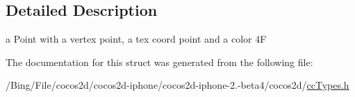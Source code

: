\subsection{Detailed Description}
a Point with a vertex point, a tex coord point and a color 4\-F 

The documentation for this struct was generated from the following file\-:\begin{DoxyCompactItemize}
\item 
/\-Bing/\-File/cocos2d/cocos2d-\/iphone/cocos2d-\/iphone-\/2.-\/beta4/cocos2d/\hyperlink{cc_types_8h}{cc\-Types.\-h}\end{DoxyCompactItemize}
